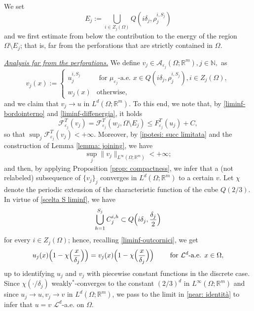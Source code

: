 \documentclass{article}
\theoremstyle{plain}
\theoremstyle{definition}
\def\rr{{\mathbb R}}
\def\NN{{\mathbb N}}
\newcommand{\ej}{\varepsilon_j}
\newcommand{\dej}{\delta_j}
\newcommand{\F}{\mathcal{F}}
\numberwithin{equation}{section}
\begin{document}
We set 
\begin{equation*}
    E_j:= \bigcup_{i\in Z_j(\Omega)} Q(i\dej, \rho_j^{i, S_j})
\end{equation*}
and we first estimate from below the contribution to the energy of the region $\Omega\setminus E_j$; that is, far from the perforations that are strictly contained in $\Omega$.

\smallskip

\underline{{\it Analysis far from the perforations.}} We define $v_{j}\in \mathcal{A}_{\varepsilon_{j}}(\Omega;\mathbb{R}^{m}), j\in\NN,$ as
\begin{equation*}
    v_{j}(x):=
    \begin{cases}
     u^{i, S_j}_{j} & \text{ for } \mu_{\ej}\text{-a.e. } x\in Q(i\delta_{j},\rho^{i, S_j}_{j}), i \in Z_{j}(\Omega),\\
                w_{j}(x) &\text{otherwise},
            \end{cases}
        \end{equation*}
and we claim that $v_j\to u$ in $L^d(\Omega;\rr^m)$. To this end, we note that, by \eqref{liminf-bordointerno} and \eqref{liminf-diffenergia}, it holds \begin{equation*}
    \F^T_{\ej}(v_j)=\F^T_{\ej}(w_j,\Omega\setminus E_j)\leq F^T_{\ej}(u_j)+C,
\end{equation*}
so that $\sup_j \F^T_{\ej}(v_j)<+\infty$. Moreover, by \eqref{ipotesi: succ limitata} and the construction of Lemma \ref{lemma: joining}, we have
\begin{equation*}
    \sup_j\|v_j\|_{L^\infty(\Omega;\rr^m)}<+\infty;
\end{equation*}
and then, by applying Proposition \ref{prop: compactness}, we infer that a (not relabeled) subsequence of $\{v_j\}_j$ converges in $L^d(\Omega;\rr^m)$ to a certain $v$. Let $\chi$ denote the periodic extension of the characteristic function of the cube $Q(2/3)$. In virtue of \eqref{scelta S liminf}, we have
\begin{equation*}
\bigcup_{h=1}^{S_j}C^{i,h}_j\subset Q\Bigl(i\dej,\frac{\dej}{2}\Bigr)
\end{equation*}
for every $i\in Z_j(\Omega)$; hence, recalling \eqref{liminf-outcornici}, we get
\begin{equation}\label{near: identità}
    u_j(x)\Bigl(1-\chi\Bigl(\frac{x}{\dej}\Bigr)\Bigr)=v_j(x)\Bigl(1-\chi\Bigl(\frac{x}{\dej}\Bigr)\Bigr) \qquad \text{ for } \mathcal{L}^d\text{-a.e. } x\in\Omega,
\end{equation}
up to identifying $u_j$ and $v_j$ with piecewise constant functions in the discrete case. Since $\chi(\cdot/\dej)$ weakly$^*$-converges to the constant $(2/3)^{d}$ in $L^\infty(\Omega; \rr^m)$ and since $u_j\to u, v_j\to v$ in $L^d(\Omega; \rr^m)$, we pass to the limit in \eqref{near: identità} to infer that
$u=v$ $\mathcal{L}^d$-a.e. on $\Omega$.
\end{document}

